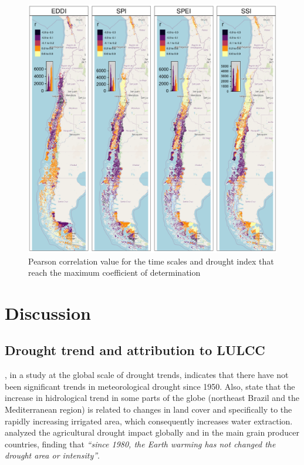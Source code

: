 \documentclass[
  number,
  preprint,
  3p,
  onecolumn]{elsarticle}
\begin{document}
\begin{figure}[!ht]

{\centering \includegraphics{../output/figs/mapa_cor_r_indices_zcNDVI6.png}

}

\caption{\label{fig-corPerson}Pearson correlation value for the time
scales and drought index that reach the maximum coefficient of
determination}

\end{figure}

\hypertarget{discussion}{%
\section{Discussion}\label{discussion}}

\hypertarget{drought-trend-and-attribution-to-lulcc}{%
\subsection{Drought trend and attribution to
LULCC}\label{drought-trend-and-attribution-to-lulcc}}

\citep{Vicente-Serrano2021}, in a study at the global scale of drought
trends, indicates that there have not been significant trends in
meteorological drought since 1950. Also, state that the increase in
hidrological trend in some parts of the globe (northeast Brazil and the
Mediterranean region) is related to changes in land cover and
specifically to the rapidly increasing irrigated area, which
consequently increases water extraction. \citep{Kogan2020} analyzed the
agricultural drought impact globally and in the main grain producer
countries, finding that \emph{``since 1980, the Earth warming has not
changed the drought area or intensity''}.
\end{document}
